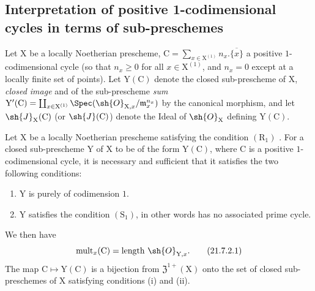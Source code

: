 \subsection{Interpretation of positive 1-codimensional cycles in terms of sub-preschemes}
\label{subsection:IV.21.7}

\begin{env}[21.7.1]
\label{IV.21.7.1}
Let $\mathrm{X}$ be a locally Noetherian prescheme, $\mathrm{C}=\sum_{x\in\mathrm{X}^{(1)}}n_x.\overline{\{x\}}$ a positive $1$-codimensional cycle (so that $n_x\geq 0$ for all $x\in\mathrm{X}^{(1)}$, and $n_x=0$ except at a locally finite set of points).
Let $\mathrm{Y}(\mathrm{C})$ denote the closed sub-prescheme of $\mathrm{X}$, \emph{closed image}  and  of the sub-prescheme \emph{sum} $\mathrm{Y}'(\mathrm{C})=\coprod_{x\in\mathrm{X}^{(1)}}\Spec(\sh{O}_{\mathrm{X},x}/\mathfrak{m}_x^{n_x})$ by the canonical morphism, and let $\sh{J}_\mathrm{X}(\mathrm{C})$ (or $\sh{J}(\mathrm{C})$) denote the Ideal of $\sh{O}_\mathrm{X}$ defining $\mathrm{Y}(\mathrm{C})$.
\end{env}

\begin{proposition}[21.7.2]
\label{IV.21.7.2}
Let $\mathrm{X}$ be a locally Noetherian prescheme satisfying the condition $(\mathrm{R}_1)$ .
For a closed sub-prescheme $\mathrm{Y}$ of $\mathrm{X}$ to be of the form $\mathrm{Y}(\mathrm{C})$, where $\mathrm{C}$ is a positive $1$-codimensional cycle, it is necessary and sufficient that it satisfies the two following conditions:
\begin{enumerate}[label=(\roman*)]
  \item $\mathrm{Y}$ is purely of codimension $1$.
  \item $\mathrm{Y}$ satisfies the condition $(\mathrm{S}_1)$, in other words  has no associated prime cycle.
\end{enumerate}
We then have
\[
\label{IV.21.7.2.1}
  \operatorname{mult}_x(\mathrm{C})=\operatorname{length}\,\sh{O}_{\mathrm{Y},x}.
  \tag{21.7.2.1}
\]
The map $\mathrm{C}\mapsto\mathrm{Y}(\mathrm{C})$ is a bijection from $\mathfrak{Z}^{1+}(\mathrm{X})$ onto the set of closed sub-preschemes of $\mathrm{X}$ satisfying conditions (i) and (ii).
\end{proposition}

